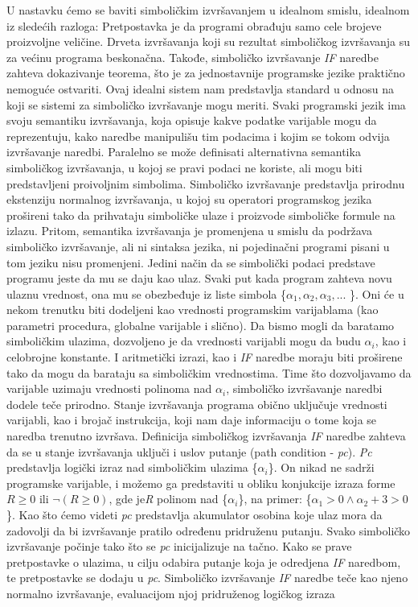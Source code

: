 \documentclass[a4paper]{article}
\begin{document}
{U nastavku ćemo se baviti simboličkim izvršavanjem u idealnom smislu, idealnom iz sledećih razloga:
Pretpostavka je da programi obrađuju samo cele brojeve proizvoljne veličine. Drveta izvršavanja koji su rezultat simboličkog izvršavanja su za većinu programa beskonačna. Takođe, simboličko izvršavanje \textit{IF} naredbe zahteva dokazivanje teorema, što je za jednostavnije programske jezike praktično nemoguće ostvariti. Ovaj idealni sistem nam predstavlja standard u odnosu na koji se sistemi za simboličko izvršavanje mogu meriti. Svaki programski jezik ima svoju semantiku izvršavanja, koja opisuje kakve podatke varijable mogu da reprezentuju, kako naredbe manipulišu tim podacima i kojim se tokom odvija  izvršavanje naredbi. Paralelno se može definisati alternativna semantika simboličkog izvršavanja, u kojoj se pravi podaci ne koriste, ali mogu biti predstavljeni proivoljnim simbolima. Simboličko izvršavanje predstavlja prirodnu ekstenziju normalnog izvršavanja, u kojoj su operatori programskog jezika prošireni tako da prihvataju simboličke ulaze i proizvode simboličke formule na izlazu. Pritom, semantika izvršavanja je promenjena u smislu da podržava simboličko izvršavanje, ali ni sintaksa jezika, ni pojedinačni programi pisani u tom jeziku nisu promenjeni. Jedini način da se simbolički podaci predstave programu jeste da mu se daju kao ulaz. Svaki put kada program zahteva novu ulaznu vrednost, ona mu se obezbeđuje iz liste simbola \{$\alpha_1, \alpha_2, \alpha_3, ... $ \}. Oni će u nekom trenutku biti dodeljeni kao vrednosti programskim varijablama (kao parametri procedura, globalne varijable i slično). Da bismo mogli da baratamo simboličkim ulazima, dozvoljeno je da vrednosti varijabli mogu da budu $\alpha_i$, kao i celobrojne konstante. I aritmetički izrazi, kao i \textit{IF} naredbe moraju biti proširene tako da mogu da barataju sa simboličkim vrednostima. Time što dozvoljavamo da varijable uzimaju vrednosti polinoma nad $\alpha_i$, simboličko izvršavanje naredbi dodele teče prirodno.
Stanje izvršavanja programa obično uključuje vrednosti varijabli, kao i brojač instrukcija, koji nam daje informaciju o tome koja se naredba trenutno izvršava. Definicija simboličkog izvršavanja \textit{IF} naredbe zahteva da se u stanje izvršavanja uključi i uslov putanje (path condition - \textit{pc}). \textit{Pc} predstavlja logički izraz nad simboličkim ulazima \{$\alpha_i$\}. On nikad ne sadrži programske varijable, i možemo ga predstaviti u obliku konjukcije izraza forme $R \ge 0$ ili  $\neg(R \ge 0)$, gde je\textit{R} polinom nad \{$\alpha_i$\}, na primer:  \{$\alpha_1 > 0 \wedge  \alpha_2 + 3 > 0 $\}. Kao što ćemo videti \textit{pc} predstavlja akumulator osobina koje ulaz mora da zadovolji da bi izvršavanje pratilo određenu pridruženu putanju. Svako simboličko izvršavanje počinje tako što se \textit{pc} inicijalizuje na tačno. Kako se prave pretpostavke o ulazima, u cilju odabira putanje koja je odredjena \textit{IF} naredbom, te pretpostavke se dodaju u \textit{pc}. Simboličko izvršavanje \textit{IF} naredbe teče kao njeno normalno izvršavanje, evaluacijom njoj pridruženog logičkog izraza 
}
\end{document}
